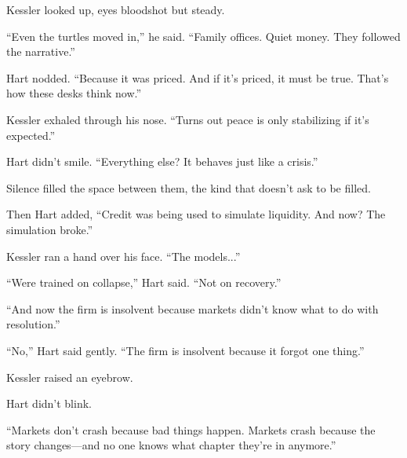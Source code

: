 Kessler looked up, eyes bloodshot but steady.

“Even the turtles moved in,” he said. “Family offices. Quiet money. They followed the narrative.”

Hart nodded. “Because it was priced. And if it’s priced, it must be true. That’s how these desks think now.”

Kessler exhaled through his nose. “Turns out peace is only stabilizing if it's expected.”

Hart didn’t smile. “Everything else? It behaves just like a crisis.”

Silence filled the space between them, the kind that doesn’t ask to be filled.

Then Hart added, “Credit was being used to simulate liquidity. And now? The simulation broke.”

Kessler ran a hand over his face. “The models...”

“Were trained on collapse,” Hart said. “Not on recovery.”

“And now the firm is insolvent because markets didn’t know what to do with resolution.”

“No,” Hart said gently. “The firm is insolvent because it forgot one thing.”

Kessler raised an eyebrow.

Hart didn’t blink.

“Markets don’t crash because bad things happen. Markets crash because the story changes—and 
no one knows what chapter they’re in anymore.”
